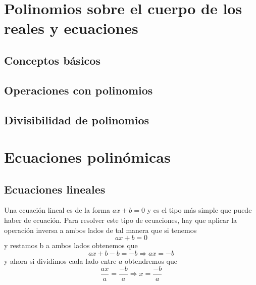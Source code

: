 \chapter{Polinomios sobre el cuerpo de los reales y ecuaciones}

\minitoc

\section{Conceptos básicos}
\section{Operaciones con polinomios}
\section{Divisibilidad de polinomios}

\chapter{Ecuaciones polinómicas}
\minitoc

\section{Ecuaciones lineales}
Una ecuación lineal es de la forma $ax+b=0$ y es el tipo más simple que puede haber de ecuación. Para resolver este tipo de ecuaciones, hay que aplicar la operación inversa a ambos lados de tal manera que si tenemos $$ax+b=0$$ y restamos b a ambos lados obtenemos que 
$$ax+b-b=-b \Rightarrow ax=-b$$ y ahora si dividimos cada lado entre $a$ obtendremos que $$\dfrac{ax}{a}=\dfrac{-b}{a} \Rightarrow x=\dfrac{-b}{a}$$ 

